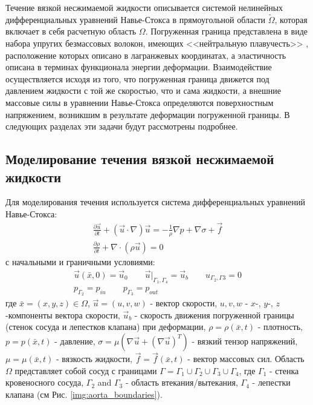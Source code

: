 Течение вязкой несжимаемой жидкости описывается системой нелинейных дифференциальных уравнений Навье-Стокса
в прямоугольной области $\tilde{\Omega}$, которая включает в себя расчетную область $\Omega$. Погруженная граница представлена в виде
набора упругих безмассовых волокон, имеющих <<нейтральную плавучесть>> \cite{griffith2012immersed},
расположение которых описано в лагранжевых координатах, а эластичность описана в терминах функционала
энергии деформации. Взаимодействие осуществляется исходя из того, что погруженная граница движется под давлением
жидкости с той же скоростью, что и сама жидкости, а внешние массовые силы в уравнении Навье-Стокса определяются
поверхностным напряжением, возникшим в результате деформации погруженной границы. В следующих разделах
эти задачи будут рассмотрены подробнее.

\subsection*{Моделирование течения вязкой несжимаемой жидкости}

Для моделирования течения используется система дифференциальных уравнений Навье-Стокса:
\begin{gather}
    \label{eq:navier_stokes:motion}
    \frac{\partial \vec{u}}{\partial t} + (\vec{u} \cdot \nabla) \vec{u} = - \frac{1}{\rho} \nabla p + \nabla \sigma + \vec{f}\\
    \label{eq:navier_stokes:continuity}
    \frac{\partial \rho}{\partial t} + \nabla \cdot (\rho \vec{u}) = 0 
\end{gather}
с начальными и граничными условиями:
\begin{gather}
    \label{eq:navier_stokes:velocity_conditions}
    \vec{u}(\bar{x}, 0) = \vec{u}_0 \qquad \vec{u}|_{\Gamma_1, \Gamma_4} = \vec{u}_b \qquad u_{\Gamma_2, \Gamma3} = 0\\
    \label{eq:navier_stokes:pressure_conditions}
    p_{\Gamma_2} = p_{in} \qquad p_{\Gamma_3} = p_{out}
\end{gather}
где $\bar{x}=(x,y,z) \in \Omega$, $\vec{u}=(u,v,w)$ - вектор скорости, $u, v, w$ - $x$-, $y$-, $z$-компоненты вектора скорости,
$\vec{u}_b$ - скорость движения погруженной границы (стенок сосуда и лепестков клапана) при деформации,
$\rho=\rho(\bar{x}, t)$ - плотность, $p=p(\bar{x}, t)$ - давление, $\sigma = \mu (\nabla \vec{u} + (\nabla \vec{u})^T)$ - вязкий тензор напряжений,
$\mu = \mu(\bar{x}, t)$ - вязкость жидкости, $\vec{f} = \vec{f}(\bar{x}, t)$ - вектор массовых сил.
Область $\Omega$ представляет собой сосуд с границами $\Gamma = \Gamma_1 \cup \Gamma_2 \cup \Gamma_3 \cup \Gamma_4$,
где $\Gamma_1$ - стенка кровеносного сосуда, $\Gamma_2$ and $\Gamma_3$ - область втекания/вытекания,
$\Gamma_4$ - лепестки клапана (см Рис. \ref{img:aorta_boundaries}).

